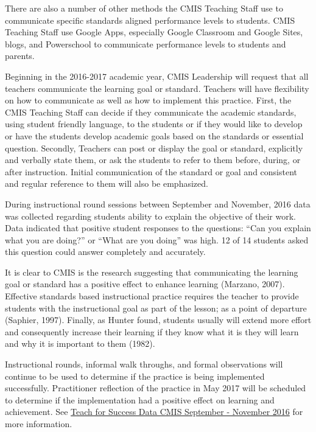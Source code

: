 \documentclass{report}
\begin{document}
\begin{findings}
There are also a number of other methods the CMIS Teaching Staff use to communicate specific standards aligned performance levels to students. CMIS Teaching Staff use Google Apps,  especially Google Classroom and Google Sites, blogs, and Powerschool to communicate performance levels to students and parents.


Beginning in the 2016-2017 academic year, CMIS Leadership will request that all teachers communicate the learning goal or standard. Teachers will have flexibility on how to communicate as well as how to implement this practice. First, the CMIS Teaching Staff can decide if they communicate the academic standards, using student friendly language, to the students or if they would like to develop or have the students develop academic goals  based on the standards or essential  question. Secondly, Teachers can post or display the goal or standard, explicitly and verbally state them, or ask the students to refer to them before, during, or after instruction. Initial communication of the standard or goal and consistent  and regular reference to them will also be emphasized. 

During instructional round sessions between September and November, 2016 data was collected regarding students ability to explain the objective of their work. Data indicated that positive student responses to the questions: “Can you explain what you are doing?” or “What are you doing” was high. 12 of 14 students asked this question could answer completely and accurately. 

It is clear to CMIS is the research suggesting that communicating the learning goal or standard has a positive effect to enhance learning (Marzano, 2007). Effective standards based instructional practice requires the teacher to provide students with the instructional goal as part of the lesson; as a point of departure (Saphier, 1997).  Finally, as Hunter found, students usually will extend more effort and consequently increase their learning if they know what it is they will learn and why it is important to them (1982). 

Instructional rounds, informal walk throughs, and formal observations will continue to be used to determine if the practice is being implemented successfully.  Practitioner reflection of the practice in May 2017 will be scheduled to determine if the implementation had a positive effect on learning and achievement. See \href{https://docs.google.com/a/cmis.ac.th/document/d/1cRvL50iIDvo8s1Gnxoczm82LhSVmEOvCrFksxzHD7ko/edit?usp=sharing}{Teach for Success Data CMIS September - November 2016} for more information. 


\end{findings}
\end{document}
